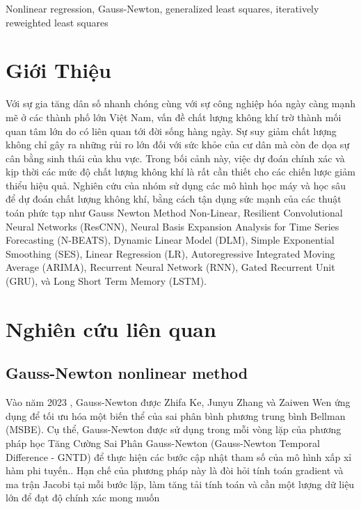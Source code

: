 \documentclass[conference]{IEEEtran}
\begin{document}
\begin{IEEEkeywords}
    Nonlinear regression, Gauss-Newton, generalized least squares, iteratively reweighted least
    squares
\end{IEEEkeywords}

\section{Giới Thiệu}
Với sự gia tăng dân số nhanh chóng cùng với sự công nghiệp hóa ngày càng mạnh mẽ ở các thành phố lớn Việt Nam, vấn đề chất lượng không khí trờ thành mối quan tâm lớn do có liên quan tới đời sống hàng ngày. Sự suy giảm chất lượng không chỉ gây ra những rủi ro lớn đối với sức khỏe của cư dân mà còn đe dọa sự cân bằng sinh thái của khu vực. Trong bối cảnh này, việc dự đoán chính xác và kịp thời các mức độ chất lượng không khí là rất cần thiết cho các chiến lược giảm thiểu hiệu quả. Nghiên cứu của nhóm sử dụng các mô hình học máy và học sâu để dự đoán chất lượng không khí, bằng cách tận dụng sức mạnh của các thuật toán phức tạp như Gauss Newton Method Non-Linear, Resilient Convolutional Neural Networks (ResCNN), Neural Basis Expansion Analysis for Time Series Forecasting (N-BEATS), Dynamic Linear Model (DLM), Simple Exponential Smoothing (SES), Linear Regression (LR), Autoregressive Integrated Moving Average (ARIMA), Recurrent Neural Network (RNN), Gated Recurrent Unit (GRU), và Long Short Term Memory (LSTM).

\section{Nghiên cứu liên quan}

\subsection{Gauss-Newton nonlinear method}

Vào năm 2023 , Gauss-Newton được Zhifa Ke, Junyu Zhang và Zaiwen Wen ứng dụng để tối ưu hóa một biến thể của sai phân bình phương trung bình Bellman (MSBE). Cụ thể, Gauss-Newton được sử dụng trong mỗi vòng lặp của phương pháp học Tăng Cường Sai Phân Gauss-Newton (Gauss-Newton Temporal Difference - GNTD) để thực hiện các bước cập nhật tham số của mô hình xấp xỉ hàm phi tuyến.\cite{gaussnewtonrelated}. Hạn chế của phương pháp này là đòi hỏi tính toán gradient và ma trận Jacobi tại mỗi bước lặp, làm tăng tải tính toán và cần một lượng dữ liệu lớn để đạt độ chính xác mong muốn
\end{document}
